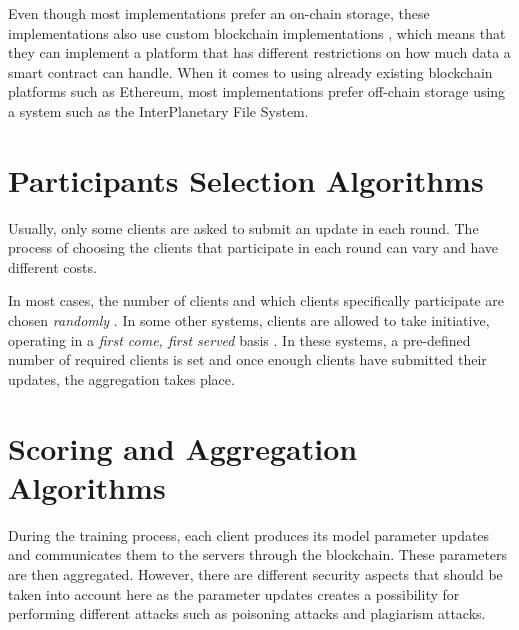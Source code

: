 Even though most implementations prefer an on-chain storage, these implementations also use custom blockchain implementations \cite{8733825, 9524833, 8894364, 9184854, 8893114}, which means that they can implement a platform that has different restrictions on how much data a smart contract can handle. When it comes to using already existing blockchain platforms such as Ethereum, most implementations prefer off-chain storage using a system such as the InterPlanetary File System\cite{10.48550/arxiv.2007.03856, 8945913, Peyvandi2022, 9170559, 10.1145/3319535.3363256, 10.48550/arxiv.2011.07516}.

\section{Participants Selection Algorithms}\label{related_work:participants_selection}

Usually, only some clients are asked to submit an update in each round. The process of choosing the clients that participate in each round can vary and have different costs.

In most cases, the number of clients and which clients specifically participate are chosen \textit{randomly} \cite{Peyvandi2022, demo, 9293091}. In some other systems, clients are allowed to take initiative, operating in a \textit{first come, first served} basis \cite{9184854, FANG20221}. In these systems, a pre-defined number of required clients is set and once enough clients have submitted their updates, the aggregation takes place.

\section{Scoring and Aggregation Algorithms}\label{related_work:scoring_techniques}

During the training process, each client produces its model parameter updates and communicates them to the servers through the blockchain. These parameters are then aggregated. However, there are different security aspects that should be taken into account here as the parameter updates creates a possibility for performing different attacks such as poisoning attacks and plagiarism attacks.

